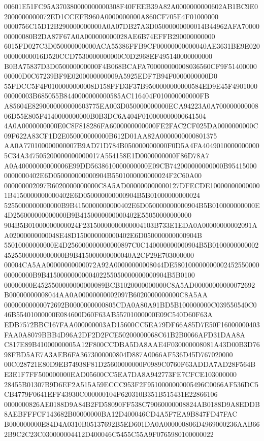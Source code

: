 \documentclass[UTF8,fontset=fandol,zihao=-4,a4paper]{ctexart}
\begin{document}
{{00601E51FC95A370380000000000308F40FEEB39A82A0000000000602AB1BC9E02000000000072ED1CCEFB960A0000000000A860CF705E4F01000000
0000756C15D12B290000000000A0A07DB27A3D05000000000014B44962AFA7000000000080B2DA87F67A0A000000000028AE6B74EFFB290000000000
6015FD027C3D050000000000ACA55386FFB9CF00000000000040AE3631BE9E02000000000016D520CCD7530000000000C0D2968EF495140000000000
B0BA75837D3D050000000000F4B068BCAFA700000000008036560CF9F5140000000000D0C67239BF9E0200000000009A5925EDF7B94F0000000000D0
55FDCC5F4F0100000000008D158FFD3F37B9500000000000584ED9E45F490100000000003B685055B8440000000000585AC116404F010000000000FB
A85604E8290000000000603775EA003D050000000000ECA94223A0A70000000000806D55E805F4140000000000B0B3DC6A404F010000000000641504
4A0A0000000000E0C8F818286FA6000000000000FE2FAC2CF025DA0000000000C09F622A83CF1D2E050000000000B612D01AA82A0000000000801375
AA0A770100000000007B9AD71D784B050000000000F0D5A4FA40490100000000005C34A347505200000000000017A554158E1D0000000000F86D78A7
A0A40000000000006E99DD5638610000000000E09CB742000000000000B954150000000000402E6D050000000000904B5501000000000024F2C60A00
000000002097B6020000000000C8A5AD000000000000127DFECDE100000000000001B4150000000000402E6D050000000000904B5B01000000000024
5255000000000000B9B4150000000000402E6D050000000000904B5B010000000000E4D256000000000000B9B4150000000000402E55050000000000
904B5B01000000000024F23150000000000004103B733E1EDA0A00000000002091AA02000000000048E48D150000000000402E6D050000000000904B
55010000000000E4D256000000000000897C0C140000000000904B5B010000000000245255000000000000B9B415000000000040A2CF29E703000000
00004CA5AA00000000000072A92A00000000008044DE58010000000000245255000000000000B9B4150000000000402255050000000000904B5B0100
00000000E4525500000000000089BCB1020000000000C8A5AD00000000000072692B00000000008044AA0A00000000002097B6020000000000C8A5AA
00000000000072692B0000000000805CDA0A80A91BD5B100000000C039550540C046B55401000000E084600D60F63AB55701000000E09C540D60F63A
EDB7572BBC167FAA000000003AD15600CC5EA79DF66A85D7E50F16000000403FAA0A8079BBB4D96A2DF2D2FCE50200000068C61B2B0066AFD31DAA8A
C817E89B41000000005A12F800CCDBA5DA8AAE4F030000008081A43D00B3D7698FBD5AE7A3AEB6FA3673000000804D887A0066AF536D45D767020000
00C028721E80D9EB74938F81D25600000000F0989C0760F63ADDA7AD28F564BE3E1F7FF500000000EAD05600CC5EA7DA8A942773FE7CFCE103000000
28455B01307B9D6EF2A515A59ECCC953F2F9510000000005496C0066AF536DC5CB4779F0641EFF43930C000000104F620310B351B515431E22866106
0000000826AE0188D9A84B2FD58090FF538C79060000008824AB0188D9A8EDDB8AEBFFFCF143682B00000000BA12D400046CD4A5F7EA9B847FD47FAC
B000000000E84D4A0310B05137692B5ED601DA0A000000806D4969000236AAB662B9C2C23C030000004412D400046C5455C55A9F0765980100000022
}}
\end{document}
